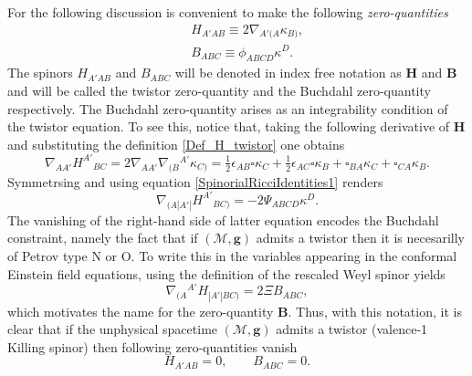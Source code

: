 \documentclass[10pt,a4paper]{article}
\theoremstyle{plain}
\def\bmg{{\bm g}}
\def\bmB{{\bm B}}
\def\bmH{{\bm H}}
\begin{document}
{For the following discussion is convenient to make the following
\emph{zero-quantities}
\begin{subequations}
  \begin{eqnarray}
   && H_{A'AB} \equiv 2
    \nabla_{A'(A}\kappa_{B)},\label{Def_H_twistor}\\ && B_{ABC}
    \equiv \phi_{ABCD}\kappa^D.\label{Def_B_twistor}
    \end{eqnarray}
\end{subequations}
The spinors $H_{A'AB}$ and $B_{ABC}$ will be denoted in index free
notation as $\bmH$ and $\bmB$ and will be called the twistor
zero-quantity and the Buchdahl zero-quantity respectively.  The
Buchdahl zero-quantity arises as an integrability condition of the
twistor equation.  To see this, notice that, taking the following
derivative of $\bmH$ and substituting the definition
\eqref{Def_H_twistor} one obtains
  \begin{equation}\label{curl_H_twistor}
  \nabla_{AA'}H^{A'}{}_{BC}= 2 \nabla_{AA'}\nabla_{(B}{}^{A'}\kappa
  _{C)} = \tfrac{1}{2} \epsilon _{AB} \square \kappa _{C}  +
  \tfrac{1}{2}  \epsilon _{AC} \square \kappa _{B} +
  \square_{BA}\kappa _{C} + \square_{CA}\kappa _{B}.
  \end{equation}
  Symmetrsing and using equation \eqref{SpinorialRicciIdentities1} renders
  \[
  \nabla_{(A|A'|}H^{A'}{}_{BC)}= - 2\Psi_{ABCD}\kappa^D.
  \]
  The vanishing of the right-hand side of latter equation encodes the
  Buchdahl constraint, namely the fact that if $(\mathcal{M},\bmg)$
  admits a twistor then it is necesarilly of Petrov type N or O. To
  write this in the variables appearing in the conformal Einstein
  field equations, using the definition of the rescaled Weyl spinor
  yields
  \begin{equation}\label{Curl_H_sym_toB_twistor}
  \nabla_{(A}{}^{A'}H_{|A'|BC)} = 2\Xi B_{ABC},
  \end{equation}
  which motivates the name for the zero-quantity $\bmB$.
  Thus, with this notation, it is clear that if the unphysical spacetime
  $(\mathcal{M},\bmg)$ admits a twistor (valence-1 Killing spinor) then following
  zero-quantities vanish
  \begin{equation}
H_{A'AB}=0, \qquad B_{ABC}=0.
  \end{equation}
}
\end{document}
